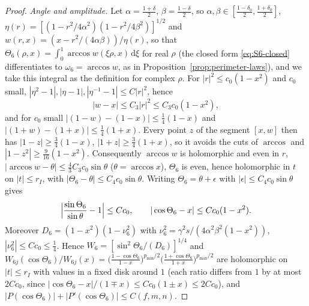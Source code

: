 \documentclass[11pt]{article}
\theoremstyle{definition}
\theoremstyle{remark}
\newcommand{\dd}{\mathrm{d}}
\renewcommand{\_}{\oldunderscore\penalty0\hskip0pt\relax}
\begin{document}
\begin{proof}
\emph{Angle and amplitude.}  Let $\alpha=\frac{1+\delta}2$, $\beta=\frac{1-\delta}2$, so $\alpha,\beta\in[\frac{1-\delta_0}2,\frac{1+\delta_0}2]$, $\eta(r)=[(1-r^2/4\alpha^2)(1-r^2/4\beta^2)]^{1/2}$ and $w(r,x)=(x-r^2/(4\alpha\beta))/\eta(r)$, so that $\Theta_6(\rho,x)=\int_0^1\arccos w(\xi\rho,x)\,\dd\xi$ for real $\rho$ (the closed form \eqref{eq:S6-closed} differentiates to $\omega_6=\arccos w$, as in Proposition~\ref{prop:perimeter-laws}), and we take this integral as the definition for complex $\rho$.  For $|r|^2\le c_0(1-x^2)$ and $c_0$ small, $|\eta^2-1|,|\eta-1|,|\eta^{-1}-1|\le C|r|^2$, hence
\begin{equation}
 |w-x|\le C_3|r|^2\le C_3c_0(1-x^2),
\end{equation}
and for $c_0$ small $|(1-w)-(1-x)|\le\frac14(1-x)$ and $|(1+w)-(1+x)|\le\frac14(1+x)$.  Every point $z$ of the segment $[x,w]$ then has $|1-z|\ge\frac34(1-x)$, $|1+z|\ge\frac34(1+x)$, so it avoids the cuts of $\arccos$ and $|1-z^2|\ge\frac9{16}(1-x^2)$.  Consequently $\arccos w$ is holomorphic and even in $r$, $|\arccos w-\theta|\le\frac43C_3c_0\sin\theta$ ($\theta=\arccos x$), $\Theta_6$ is even, hence holomorphic in $t$ on $|t|\le r_I$, with $|\Theta_6-\theta|\le C_4c_0\sin\theta$.  Writing $\Theta_6=\theta+\epsilon$ with $|\epsilon|\le C_4c_0\sin\theta$ gives
\begin{equation}
 \Bigl|\frac{\sin\Theta_6}{\sin\theta}-1\Bigr|\le Cc_0,\qquad|\cos\Theta_6-x|\le Cc_0(1-x^2).
\end{equation}
Moreover $D_6=(1-x^2)(1-\nu_6^2)$ with $\nu_6^2=\gamma^2s/(4\alpha^2\beta^2(1-x^2))$, $|\nu_6^2|\le C c_0\le\frac14$.  Hence $W_6=[\sin^2\Theta_6/(D_6)]^{1/4}$ and $W_{6j}(\cos\Theta_6)/W_{6j}(x)=\bigl(\frac{1-\cos\Theta_6}{1-x}\bigr)^{p_{\min}/2}\bigl(\frac{1+\cos\Theta_6}{1+x}\bigr)^{p_{\max}/2}$ are holomorphic on $|t|\le r_I$ with values in a fixed disk around $1$ (each ratio differs from $1$ by at most $2Cc_0$, since $|\cos\Theta_6-x|/(1\mp x)\le Cc_0(1\pm x)\le2Cc_0$), and $|P(\cos\Theta_6)|+|P'(\cos\Theta_6)|\le C(f,m,n)$.


\end{proof}
\end{document}
